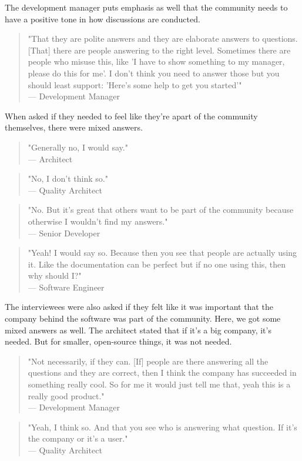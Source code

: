 \documentclass{article}
\begin{document}
The development manager puts emphasis as well that the community needs to have a positive tone in how discussions are conducted.
\begin{quote}
"That they are polite answers and they are elaborate answers to questions. [That] there are people answering to the right level. Sometimes there are people who misuse this, like 'I have to show something to my manager, please do this for me'. I don't think you need to answer those but you should least support: 'Here's some help to get you started'"\\--- Development Manager
\end{quote}
When asked if they needed to feel like they're apart of the community themselves, there were mixed answers.
\begin{quote}
"Generally no, I would say."\\ --- Architect
\end{quote}
\begin{quote}
"No, I don't think so."\\--- Quality Architect
\end{quote}
\begin{quote}
"No. But it's great that others want to be part of the community because otherwise I wouldn't find my answers."\\--- Senior Developer
\end{quote}
\begin{quote}
"Yeah! I would say so. Because then you see that people are actually using it. Like the documentation can be perfect but if no one using this, then why should I?"\\--- Software Engineer
\end{quote}
The interviewees were also asked if they felt like it was important that the company behind the software was part of the community. Here, we got some mixed answers as well. The architect stated that if it's a big company, it's needed. But for smaller, open-source things, it was not needed.
\begin{quote}
"Not necessarily, if they can. [If] people are there answering all the questions and they are correct, then I think the company has succeeded in something really cool. So for me it would just tell me that, yeah this is a really good product."\\--- Development Manager
\end{quote}
\begin{quote}
"Yeah, I think so. And that you see who is answering what question. If it's the company or it's a user."\\--- Quality Architect
\end{quote}
\end{document}
